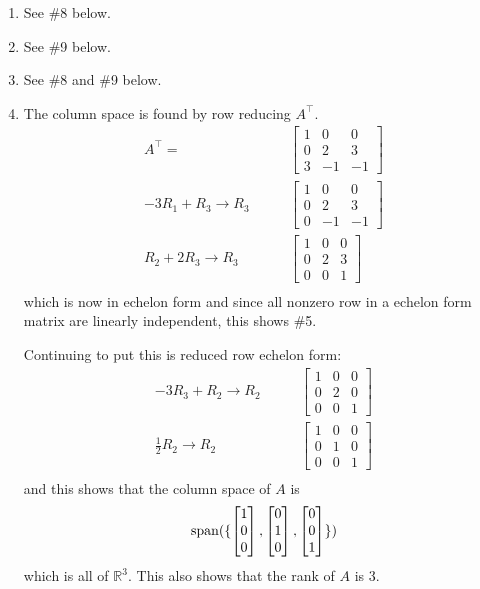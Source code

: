 \begin{example}
\begin{enumerate}
\item See \#8 below.
\item See \#9 below.
\item See \#8 and \#9 below.

\item The column space is found by row reducing $A^{\intercal}$.
%
\begin{align*}
A^{\intercal} = &\begin{bmatrix}
1 & 0 & 0 \\
0 & 2 & 3 \\
3 & -1 & -1
\end{bmatrix} \\
-3 R_1 + R_3 \rightarrow R_3 \qquad &
\begin{bmatrix}
1 &  0 & 0 \\
0 & 2 & 3\\
0 & -1 & -1
\end{bmatrix} \\
R_2 + 2 R_3 \rightarrow R_3 \qquad &
\begin{bmatrix}
1 &  0 & 0 \\
0 & 2 & 3\\
0 & 0 & 1
\end{bmatrix} \\
\end{align*}
which is now in echelon form and since all nonzero row in a echelon form matrix are linearly independent, this shows \#5.

Continuing to put this is reduced row echelon form:
\begin{align*}
-3R_3 + R_2 \rightarrow R_2 \qquad &
\begin{bmatrix}
1 &  0 & 0 \\
0 & 2 & 0\\
0 & 0 & 1
\end{bmatrix} \\
\frac{1}{2} R_2 \rightarrow R_2 \qquad &
\begin{bmatrix}
1 &  0 & 0 \\
0 & 1 & 0\\
0 & 0 & 1
\end{bmatrix} \\
\end{align*}
and this shows that the column space of $A$ is
%
\begin{align*}
\operatorname{span}(\{ \begin{bmatrix}
1 \\ 0 \\ 0
\end{bmatrix}, \begin{bmatrix}
0 \\ 1\\0
\end{bmatrix}, \begin{bmatrix}
 0 \\ 0 \\ 1
\end{bmatrix} \} )
\end{align*}
which is all of $\mathbb{R}^3$.   This also shows that the rank of $A$ is 3.


\end{enumerate}
\end{example}
